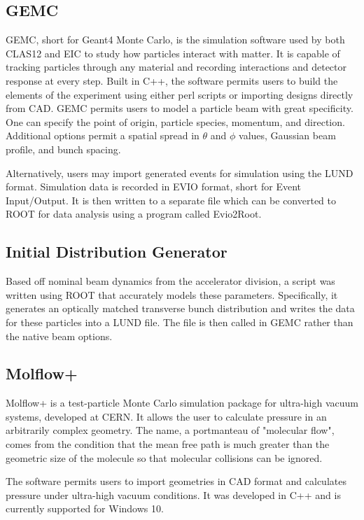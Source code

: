 \subsection{GEMC}

GEMC, short for Geant4 Monte Carlo, is the simulation software used by both CLAS12 and EIC to study how particles interact with matter.  It is capable of tracking particles through any material and recording interactions and detector response at every step.  Built in C++, the software permits users to build the elements of the experiment using either perl scripts or importing designs directly from CAD.  GEMC permits users to model a particle beam with great specificity.  One can specify the point of origin, particle species, momentum, and direction.  Additional options permit a spatial spread in $\theta$ and $\phi$ values, Gaussian beam profile, and bunch spacing. 

Alternatively, users may import generated events for simulation using the LUND format.  Simulation data is recorded in EVIO format, short for Event Input/Output.  It is then written to a separate file which can be converted to ROOT for data analysis using a program called Evio2Root.

\subsection{Initial Distribution Generator}
Based off nominal beam dynamics from the accelerator division, a script was written using ROOT that accurately models these parameters.  Specifically, it generates an optically matched transverse bunch distribution and writes the data for these particles into a LUND file.  The file is then called in GEMC rather than the native beam options.  
  

\subsection{Molflow+}

Molflow+ is a test-particle Monte Carlo simulation package for ultra-high vacuum systems, developed at CERN.  It allows the user to calculate pressure in an arbitrarily complex geometry.  The name, a portmanteau of "molecular flow", comes from the condition that the mean free path is much greater than the geometric size of the molecule so that molecular collisions can be ignored.

The software permits users to import geometries in CAD format and calculates pressure under ultra-high vacuum conditions. It was developed in C++ and is currently supported for Windows 10.

